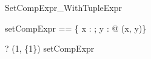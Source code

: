 \begin{zsection}
  \SECTION SetCompExpr\_WithTupleExpr
\end{zsection}

\begin{zed}
  setCompExpr == \{ x : \nat; y : \power \nat @ (x, y)\}
\end{zed}

\begin{zed}
  \vdash? (1, \{1\}) \in setCompExpr
\end{zed}
